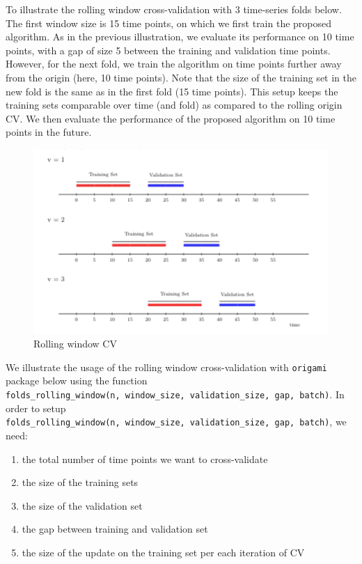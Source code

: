 \documentclass[12pt, krantz2,]{krantz}
\providecommand{\tightlist}{%
  \setlength{\itemsep}{0pt}\setlength{\parskip}{0pt}}
\theoremstyle{definition}
\theoremstyle{definition}
\theoremstyle{definition}
\newcommand{\1}{\mathbbm{1}}
\begin{document}
To illustrate the rolling window cross-validation with 3 time-series folds
below. The first window size is 15 time points, on which we first train the
proposed algorithm. As in the previous illustration, we evaluate its performance
on 10 time points, with a gap of size 5 between the training and validation time
points. However, for the next fold, we train the algorithm on time points
further away from the origin (here, 10 time points). Note that the size of the
training set in the new fold is the same as in the first fold (15 time points).
This setup keeps the training sets comparable over time (and fold) as compared
to the rolling origin CV. We then evaluate the performance of the proposed
algorithm on 10 time points in the future.

\begin{figure}

{\centering \includegraphics[width=0.8\linewidth]{img/image/rolling_window} 

}

\caption{Rolling window CV}\label{fig:unnamed-chunk-2}
\end{figure}

We illustrate the usage of the rolling window cross-validation with \texttt{origami}
package below using the function \texttt{folds\_rolling\_window(n,\ window\_size,\ validation\_size,\ gap,\ batch)}. In order to setup \texttt{folds\_rolling\_window(n,\ window\_size,\ validation\_size,\ gap,\ batch)}, we need:

\begin{enumerate}
\def\labelenumi{\arabic{enumi}.}
\tightlist
\item
  the total number of time points we want to cross-validate
\item
  the size of the training sets
\item
  the size of the validation set
\item
  the gap between training and validation set
\item
  the size of the update on the training set per each iteration of CV
\end{enumerate}
\end{document}
